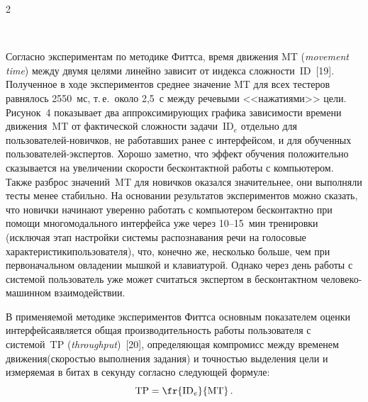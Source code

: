 \begin{multicols}{2}
\begin{figure} %
 \vspace*{1pt}
 \begin{center}
 \mbox{%
 \epsfxsize=156.193mm
 }
 \end{center}
 \vspace*{-9pt}
 \begin{minipage}[t]{78mm}
\end{minipage}
\hfill
\begin{minipage}[t]{78mm}
\end{minipage}
\end{figure}
    
  Согласно экспериментам по методике Фиттса, время движения 
 MT (\textit{movement time}) между двумя целями линейно зависит от индекса 
слож\-ности~ID~[19]. Полученное в ходе экспериментов среднее значение 
MT для всех тестеров равнялось 2550~мс, т.\,е.\ около 2,5~с между 
речевыми <<нажатиями>> цели. Рисунок~4 показывает два 
аппроксимирующих графика зависимости времени движения~MT от 
фактической сложности задачи~ID$_e$ отдельно для поль\-зо\-ва\-те\-лей-но\-вич\-ков, не 
работавших ранее с интерфейсом, и для обученных поль\-зо\-ва\-те\-лей-экс\-пер\-тов. 
Хорошо заметно, что эффект обучения положительно сказывается на 
увеличении скорости бесконтактной работы с компьютером. Также разброс 
значений~MT для новичков оказался значительнее, они выполняли тесты 
менее стабильно. На основании результатов экспериментов можно сказать, что 
новички начинают уверенно работать с компьютером бесконтактно при 
помощи многомодального интерфейса уже через 10--15~мин тренировки 
(исключая этап настройки системы распознавания речи на голосовые 
характеристики\linebreak пользователя), что, конечно же, несколько больше, чем при 
первоначальном овладении мышкой и клавиатурой. Однако через день работы с 
системой пользователь уже может считаться экспертом в бесконтактном 
человеко-машинном взаимодействии.


  В применяемой методике экспериментов \mbox{Фиттса} основным показателем 
оценки интерфейса\linebreak является общая производительность работы пользователя с 
системой~TP (\textit{throughput})~[20], определяющая компромисс между 
временем движения\linebreak (скоростью выполнения задания) и точностью выделения 
цели и измеряемая в битах в секунду согласно следующей формуле: 
  \begin{equation}
\mathrm{TP}=\fr{\mathrm{ID}_e}{\mathrm{MT}}\,.
  \label{e4kar}
  \end{equation}
  

\end{multicols}
